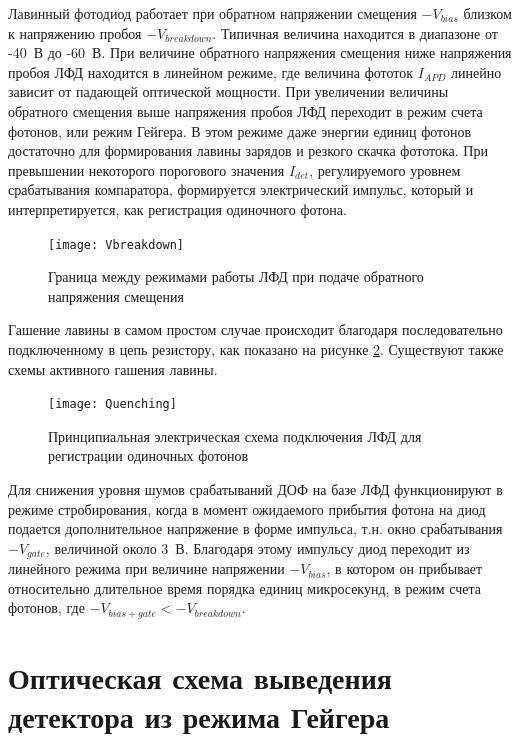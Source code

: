 Лавинный фотодиод работает при обратном напряжении смещения $-V_{bias}$ близком к напряжению пробоя $-V_{breakdown}$. Типичная величина находится в диапазоне от -40~В до -60~В. При величине обратного напряжения смещения ниже напряжения пробоя ЛФД находится в линейном режиме, где величина фототок $I_{APD}$ линейно зависит от падающей оптической мощности. При увеличении величины обратного смещения выше напряжения пробоя ЛФД переходит в режим счета фотонов, или режим Гейгера. В этом режиме даже энергии единиц фотонов достаточно для формирования лавины зарядов и резкого скачка фототока. При превышении некоторого порогового значения $I_{det}$, регулируемого уровнем срабатывания компаратора, формируется электрический импульс, который и интерпретируется, как регистрация одиночного фотона. 

 \begin{figure}[ht]
  \centering
  \texttt{[image: Vbreakdown]}
  \caption{Граница между режимами работы ЛФД при подаче обратного напряжения смещения}
  \label{fig:Vbreakdown}
\end{figure}

Гашение лавины в самом простом случае происходит благодаря последовательно подключенному в цепь резистору, как показано на рисунке \ref{fig:Quenching}. Существуют также схемы активного гашения лавины.  
 \begin{figure}[ht]
  \centering
  \texttt{[image: Quenching]}
  \caption{Принципиальная электрическая схема подключения ЛФД для регистрации одиночных фотонов}
  \label{fig:Quenching}
\end{figure}


Для снижения уровня шумов срабатываний ДОФ на базе ЛФД функционируют в режиме стробирования, когда в момент ожидаемого прибытия фотона на диод подается дополнительное напряжение в форме импульса, т.\:н. окно срабатывания $-V_{gate}$, величиной около 3~В. Благодаря этому импульсу диод переходит из линейного режима при величине напряжении $-V_{bias}$, в котором он прибывает относительно длительное время порядка единиц микросекунд, в режим счета фотонов, где $-V_{bias+gate} < - V_{breakdown}$.  


\section{Оптическая схема выведения детектора из режима Гейгера} \label{sec:ch2/sec3}

